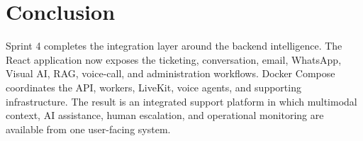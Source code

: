 \section*{Conclusion}

Sprint 4 completes the integration layer around the backend intelligence. The React application now exposes the ticketing, conversation, email, WhatsApp, Visual AI, RAG, voice-call, and administration workflows. Docker Compose coordinates the API, workers, LiveKit, voice agents, and supporting infrastructure. The result is an integrated support platform in which multimodal context, AI assistance, human escalation, and operational monitoring are available from one user-facing system.
